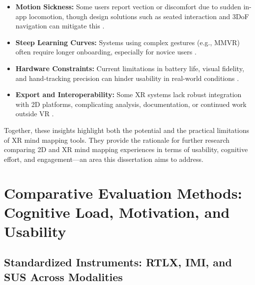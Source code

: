 \documentclass{CPP}
\begin{document}
\begin{itemize}
  \item \textbf{Motion Sickness:} Some users report vection or discomfort due to sudden in-app locomotion, though design solutions such as seated interaction and 3DoF navigation can mitigate this \citep{Sims2021}.
  \item \textbf{Steep Learning Curves:} Systems using complex gestures (e.g., MMVR) often require longer onboarding, especially for novice users \citep{Miyasugi2017}.
  \item \textbf{Hardware Constraints:} Current limitations in battery life, visual fidelity, and hand-tracking precision can hinder usability in real-world conditions \citep{Xing2024}.
  \item \textbf{Export and Interoperability:} Some XR systems lack robust integration with 2D platforms, complicating analysis, documentation, or continued work outside VR \citep{Vetter2020}.
\end{itemize}

Together, these insights highlight both the potential and the practical limitations of XR mind mapping tools. They provide the rationale for further research comparing 2D and XR mind mapping experiences in terms of usability, cognitive effort, and engagement—an area this dissertation aims to address.


\section{Comparative Evaluation Methods: Cognitive Load, Motivation, and Usability}

\subsection{Standardized Instruments: RTLX, IMI, and SUS Across Modalities}
\end{document}
